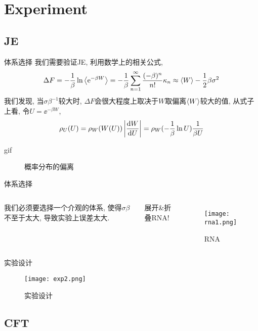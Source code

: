 \section{Experiment}
    \subsection{JE}
    \begin{frame}{体系选择}
        我们需要验证JE, 利用数学上的相关公式,
        \begin{equation}
            \Delta F = -\frac1\beta \ln \expval{\mathrm{e}^{-\beta W}} 
            = -\frac1\beta \sum_{n=1}^\infty \frac{(-\beta)^n}{n!} \kappa_n 
            \approx \expval{W} - \frac12\beta\sigma^2
        \end{equation}
        我们发现, 当$\sigma\beta^{-1}$较大时, $\Delta F$会很大程度上取决于$W$取偏离$\expval{W}$较大的值, 从式子上看, 令$U = \ee^{-\beta W}$,
        \begin{equation}
            \rho_U(U) = \rho_W(W(U)) \left|\dv{W}{U}\right| = \rho_W(-\frac1\beta\ln U) \frac1{\beta U}
        \end{equation}
    \end{frame}
    \begin{frame}{gif}
        \begin{figure}[H]
            \centering
            \caption{概率分布的偏离}
        \end{figure}
    \end{frame}
    \begin{frame}{体系选择}
        \begin{columns}
            我们必须要选择一个介观的体系, 使得$\sigma\beta$不至于太大, 导致实验上误差太大. 
            \pause
            \begin{center}
                {\Large 展开\&折叠RNA!}
            \end{center}
            \begin{figure}
                \centering
                \texttt{[image: rna1.png]}
                \caption{RNA}
            \end{figure}
        \end{columns}
    \end{frame}
    \begin{frame}{实验设计}
        \begin{figure}
            \centering
            \texttt{[image: exp2.png]}
            \caption{实验设计}
        \end{figure}
    \end{frame}
    \subsection{CFT}
% 